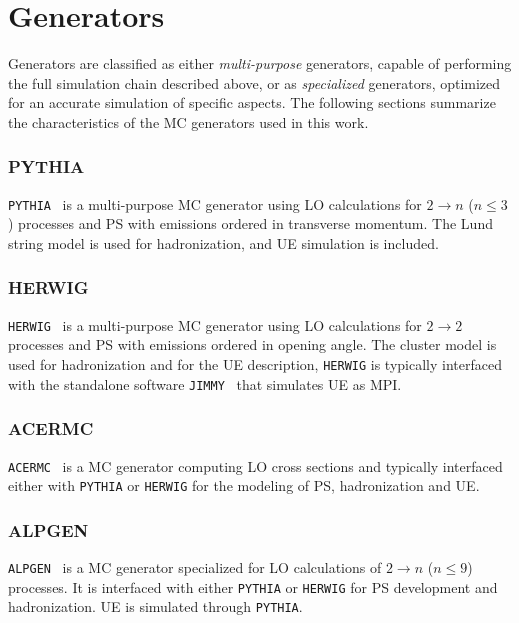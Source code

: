 \section{Generators}
\label{sec:generators}

Generators are classified as either {\it multi-purpose}
generators, capable of performing the full simulation chain described
above, or as {\it specialized} generators, optimized for
an accurate simulation of specific aspects.
The following sections summarize the characteristics of the MC
generators used in this work.

\subsubsection*{PYTHIA}

\texttt{PYTHIA}~\cite{pythia6,pythia8} is a multi-purpose MC
generator using LO calculations for $2 \to n$ ($n\leq 3$) processes
and PS with emissions ordered in transverse momentum. 
The Lund string model is used for hadronization, and UE simulation is
included.

\subsubsection*{HERWIG}

\texttt{HERWIG}~\cite{herwig} is a multi-purpose MC generator using LO
calculations for $2 \to 2$ processes and PS with emissions ordered in
opening angle. 
The cluster model is used for hadronization and for the UE
description, \texttt{HERWIG} is typically interfaced with the
standalone software \texttt{JIMMY}~\cite{jimmy} that simulates UE as MPI.

\subsubsection*{ACERMC}

\texttt{ACERMC}~\cite{acermc} is a MC generator computing LO cross
sections and typically interfaced either with \texttt{PYTHIA} or 
\texttt{HERWIG} for the modeling of PS, hadronization and UE.

\subsubsection*{ALPGEN}

\texttt{ALPGEN}~\cite{alpgen} is a MC generator specialized
for LO calculations of $2 \to n$ ($n\leq 9$)
processes. It is interfaced with either
\texttt{PYTHIA} or \texttt{HERWIG} for PS development and
hadronization. UE is simulated through \texttt{PYTHIA}. 

